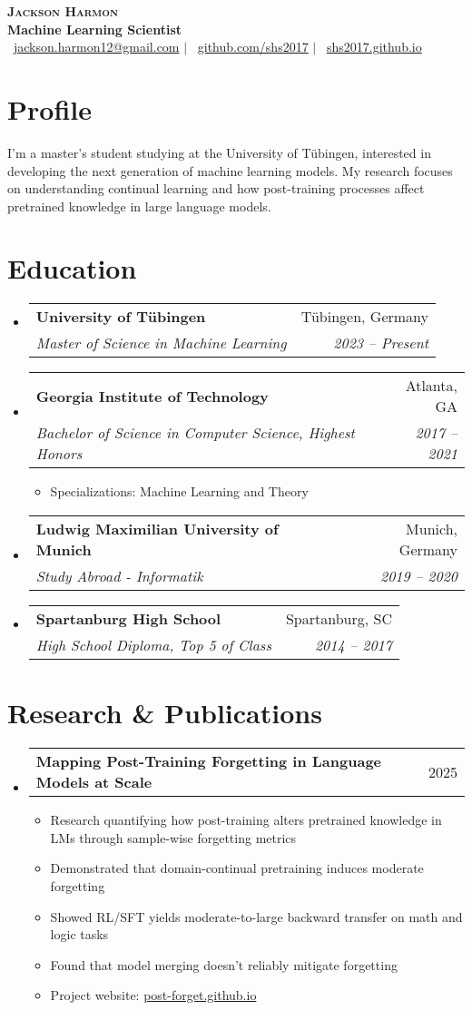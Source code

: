\documentclass[letterpaper,11pt]{article}
\makeatletter
\newcommand{\resumeItem}[1]{
  \item\small{
    {#1 \vspace{-2pt}}
  }
}
\newcommand{\resumeSubheading}[4]{
  \vspace{-2pt}\item
    \begin{tabular*}{0.97\textwidth}[t]{l@{\extracolsep{\fill}}r}
      \textbf{#1} & #2 \\
      \textit{\small#3} & \textit{\small #4} \\
    \end{tabular*}\vspace{-7pt}
}
\newcommand{\resumeProjectHeading}[2]{
    \item
    \begin{tabular*}{0.97\textwidth}{l@{\extracolsep{\fill}}r}
      \small#1 & #2 \\
    \end{tabular*}\vspace{-7pt}
}
\newcommand{\resumeSubHeadingListStart}{\begin{itemize}[leftmargin=0.15in, label={}]}
\newcommand{\resumeSubHeadingListEnd}{\end{itemize}}
\newcommand{\resumeItemListStart}{\begin{itemize}}
\newcommand{\resumeItemListEnd}{\end{itemize}\vspace{-5pt}}
\makeatother
\begin{document}
\begin{center}
    \textbf{\Huge \scshape Jackson Harmon} \\ \vspace{1pt}
    \textbf{\large Machine Learning Scientist} \\ \vspace{5pt}
    \small \faEnvelope\ \href{mailto:jackson.harmon12@gmail.com}{jackson.harmon12@gmail.com} $|$ 
    \faGithub\ \href{https://github.com/shs2017}{github.com/shs2017} $|$
    \faLink\ \href{https://shs2017.github.io}{shs2017.github.io}
\end{center}


\section{Profile}
I'm a master's student studying at the University of Tübingen, interested in developing the next generation of machine learning models. My research focuses on understanding continual learning and how post-training processes affect pretrained knowledge in large language models.


\section{Education}
  \resumeSubHeadingListStart
    \resumeSubheading
      {University of Tübingen}{Tübingen, Germany}
      {Master of Science in Machine Learning}{2023 -- Present}
      
    \resumeSubheading
      {Georgia Institute of Technology}{Atlanta, GA}
      {Bachelor of Science in Computer Science, Highest Honors}{2017 -- 2021}
      \resumeItemListStart
        \resumeItem{Specializations: Machine Learning and Theory}
      \resumeItemListEnd
      
    \resumeSubheading
      {Ludwig Maximilian University of Munich}{Munich, Germany}
      {Study Abroad - Informatik}{2019 -- 2020}
      
    \resumeSubheading
      {Spartanburg High School}{Spartanburg, SC}
      {High School Diploma, Top 5 of Class}{2014 -- 2017}
  \resumeSubHeadingListEnd


\section{Research \& Publications}
  \resumeSubHeadingListStart
    \resumeProjectHeading
      {\textbf{Mapping Post-Training Forgetting in Language Models at Scale}}{2025}
      \resumeItemListStart
        \resumeItem{Research quantifying how post-training alters pretrained knowledge in LMs through sample-wise forgetting metrics}
        \resumeItem{Demonstrated that domain-continual pretraining induces moderate forgetting}
        \resumeItem{Showed RL/SFT yields moderate-to-large backward transfer on math and logic tasks}
        \resumeItem{Found that model merging doesn't reliably mitigate forgetting}
        \resumeItem{Project website: \href{https://post-forget.github.io/}{post-forget.github.io}}
      \resumeItemListEnd
  \resumeSubHeadingListEnd
\end{document}
